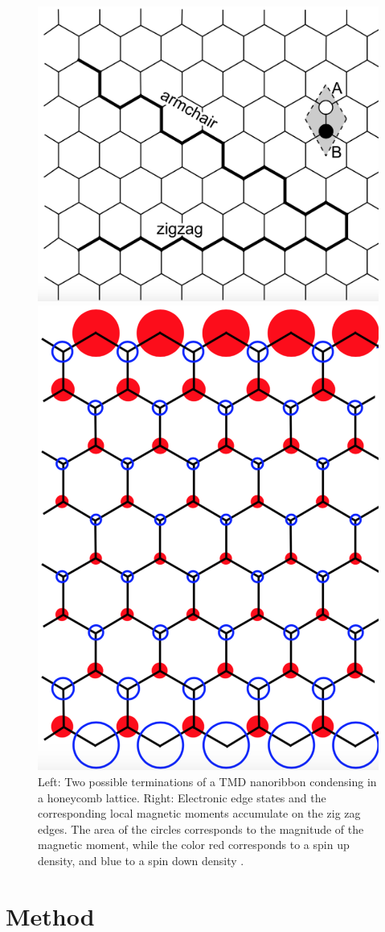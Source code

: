 \documentclass[a0,portrait]{a0poster}
\begin{document}
\begin{multicols}{3}
\begin{figure}
\begin{minipage}[c]{0.2\textwidth}
\centering
\hspace{-3.5cm}
\includegraphics[width=0.65\linewidth]{zigzag}
\end{minipage} \hspace{-2cm}
\begin{minipage}[c]{0.2\textwidth}
\includegraphics[width=0.45\linewidth]{edge_states}
\end{minipage}
\caption{\small{Left: Two possible terminations of a TMD nanoribbon condensing in a honeycomb lattice. Right: Electronic edge states and the  corresponding local magnetic moments accumulate on the zig zag edges. The area of the circles corresponds to the magnitude of the magnetic moment, while the color red corresponds to a spin up density, and blue to a spin down density \cite{yazyev}.} \label{fig:nanoribbons}}
\end{figure}
\vspace{-1cm}
\section{Method}


\end{multicols}
\end{document}

